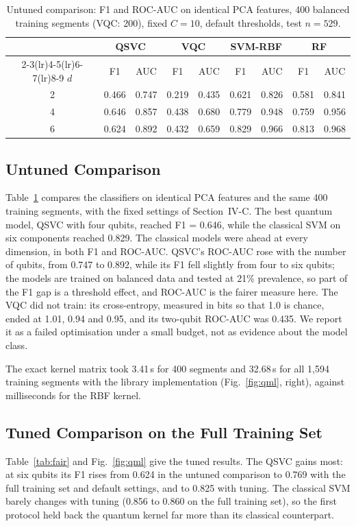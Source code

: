 \documentclass[conference]{IEEEtran}
\begin{document}
\begin{table}[t]
\caption{Untuned comparison: F1 and ROC-AUC on identical PCA features, 400 balanced training
segments (VQC: 200), fixed $C = 10$, default thresholds, test $n = 529$.}
\label{tab:qml}
\centering
\setlength{\tabcolsep}{3.2pt}
\begin{tabular}{ccccccccc}
\toprule
 & \multicolumn{2}{c}{QSVC} & \multicolumn{2}{c}{VQC} & \multicolumn{2}{c}{SVM-RBF} & \multicolumn{2}{c}{RF} \\
\cmidrule(lr){2-3}\cmidrule(lr){4-5}\cmidrule(lr){6-7}\cmidrule(lr){8-9}
$d$ & F1 & AUC & F1 & AUC & F1 & AUC & F1 & AUC \\
\midrule
2 & 0.466 & 0.747 & 0.219 & 0.435 & 0.621 & 0.826 & 0.581 & 0.841 \\
4 & 0.646 & 0.857 & 0.438 & 0.680 & 0.779 & 0.948 & 0.759 & 0.956 \\
6 & 0.624 & 0.892 & 0.432 & 0.659 & 0.829 & 0.966 & 0.813 & 0.968 \\
\bottomrule
\end{tabular}
\end{table}

\subsection{Untuned Comparison}
Table~\ref{tab:qml} compares the classifiers on identical PCA features and the same 400
training segments, with the fixed settings of Section~IV-C. The best quantum model, QSVC with four qubits, reached
F1 = 0.646, while the classical SVM on six components reached 0.829. The classical models
were ahead at every dimension, in both F1 and ROC-AUC. QSVC's ROC-AUC rose with the number of
qubits, from 0.747 to 0.892, while its F1 fell slightly from four to six qubits; the models
are trained on balanced data and tested at 21\% prevalence, so part of the F1 gap is a
threshold effect, and ROC-AUC is the fairer measure here. The VQC did not train: its
cross-entropy, measured in bits so that 1.0 is chance, ended at 1.01, 0.94 and 0.95, and its
two-qubit ROC-AUC was 0.435. We report it as a failed optimisation under a small budget, not
as evidence about the model class.

The exact kernel matrix took 3.41\,s for 400 segments and 32.68\,s for all 1,594 training
segments with the library implementation (Fig.~\ref{fig:qml}, right), against milliseconds
for the RBF kernel.

\subsection{Tuned Comparison on the Full Training Set}
Table~\ref{tab:fair} and Fig.~\ref{fig:qml} give the tuned results. The QSVC gains most: at
six qubits its F1 rises from 0.624 in the untuned comparison to 0.769 with the full training
set and default settings, and to 0.825 with tuning. The classical SVM barely changes with
tuning (0.856 to 0.860 on the full training set), so the first protocol held back the quantum
kernel far more than its classical counterpart.
\end{document}
